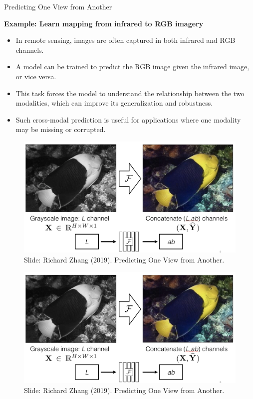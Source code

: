 \begin{frame}[allowframebreaks]{Predicting One View from Another}
    \framebreak

    \textbf{Example: Learn mapping from infrared to RGB imagery}
    \begin{itemize}
        \item In remote sensing, images are often captured in both infrared and RGB channels.
        \item A model can be trained to predict the RGB image given the infrared image, or vice versa.
        \item This task forces the model to understand the relationship between the two modalities, which can improve its generalization and robustness.
        \item Such cross-modal prediction is useful for applications where one modality may be missing or corrupted.
    \end{itemize}

    \framebreak

    \begin{figure}
        \flushleft
        \includegraphics[width=1\linewidth,height=\textheight,keepaspectratio]{images/ssl/slide_26_1_img.png}
        Slide: Richard Zhang (2019). Predicting One View from Another.
    \end{figure}

    \framebreak

    \begin{figure}
        \flushleft
        \includegraphics[width=1\linewidth,height=\textheight,keepaspectratio]{images/ssl/slide_27_1_img.png}
        Slide: Richard Zhang (2019). Predicting One View from Another.
    \end{figure}


\end{frame}
